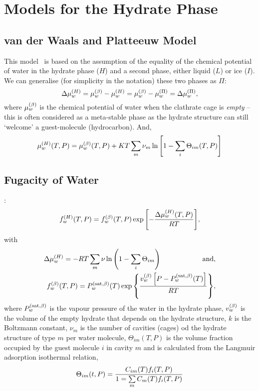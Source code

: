 \section{Models for the Hydrate Phase}\label{Chapter:Hydrate:Section:HydrateModels}


\subsection{van der Waals and Platteeuw Model}\label{Chapter:Hydrate:Section:HydrateModels:Section:vdW_Platteeuw}
This model~\citep{vdWP_1959} is based on the assumption of the equality of the chemical potential of water in the hydrate phase ($H$) and a second phase, either liquid ($L$) or ice ($I$). We can generalise (for simplicity in the notation) these two phases as $\Pi$:
   \begin{equation}
      \Delta\mfr[\mu]{w}{H} = \mfr[\mu]{w}{\beta} - \mfr[\mu]{w}{H} =  \mfr[\mu]{w}{\beta} - \mfr[\mu]{w}{\Pi} = \Delta\mfr[\mu]{w}{\Pi},
   \end{equation}
where $\mfr[\mu]{w}{\beta}$ is the chemical potential of water when the clathrate cage is {\it empty} -- this is often considered as a meta-stable phase as the hydrate structure can still `welcome' a guest-molecule (hydrocarbon). And,
   \begin{equation}
     \mfr[\mu]{w}{H}(T,P) = \mfr[\mu]{w}{\beta}(T,P) + KT\summation_{m}\nu_{m}\ln{\left[1-\summation_{i}\Theta_{im}(T,P)\right]}
   \end{equation}

\subsection{Fugacity of Water}\label{Chapter:Hydrate:Section:HydrateModels:Section:FugacityWater}
\citet{klauda_2000}:
   \begin{equation}
      \mfr[f]{w}{H}(T,P) = \mfr[f]{w}{\beta}(T,P)\exp{\left[-\frc{\Delta\mfr[\mu]{w}{H}(T,P)}{RT}\right]},
   \end{equation}
with 
   \begin{eqnarray}
       \Delta\mfr[\mu]{w}{H} = -RT\summation_{m}\nu_{}\ln{\left(1-\summation_{i}\Theta_{im}\right)}\hspace{2cm}\text{ and}, \\
       \mfr[f]{w}{\beta}(T,P) = \mfr[P]{w}{\text{sat},\beta}(T)\exp{\left\{\frc{\mfr[v]{w}{\beta}\left[P-\mfr[P]{w}{\text{sat},\beta}(T)\right]}{RT}\right\}},
   \end{eqnarray}
where $\mfr[P]{w}{\text{sat},\beta}$ is the vapour pressure of the water in the hydrate phase, $\mfr[v]{w}{\beta}$ is the volume of the empty hydrate that depends on the hydrate structure, $k$ is the Boltzmann constant, $\nu_{m}$ is the number of cavities (\ie cages) od the hydrate structure of type $m$ per water molecule, $\Theta_{im}(T,P)$ is the volume fraction occupied by the guest molecule $i$ in cavity $m$ and is calculated from the Langmuir adsorption isothermal relation,
   \begin{equation}
      \Theta_{im}(t,P) = \frc{C_{im}(T)f_{i}(T,P)}{1=\summation_{m}C_{m}(T)f_{i}(T,P)}
   \end{equation}
